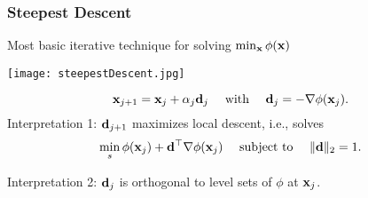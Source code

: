 
\begin{frame}
	\frametitle{Steepest Descent}
	Most basic iterative technique for solving $\min_{\bf x} \phi({\bf x})$
	\begin{center}
		\texttt{[image: steepestDescent.jpg]}
	\end{center}
	\begin{equation*}
		{\bf x}_{j+1} = {\bf x}_j + \alpha_j {\bf d}_j \quad \text{ with } \quad {\bf d}_j =  - \nabla \phi({\bf x}_j).
	\end{equation*}
	\pause
	Interpretation 1: ${\bf d}_{j+1}$ maximizes local descent, i.e., solves
	\begin{equation*}
		\min_{s} \phi({\bf x}_j) + {\bf d}^\top \nabla \phi({\bf x}_j) \quad \text{ subject to }\quad \|{\bf d}\|_2 = 1.
	\end{equation*}
	
	\pause
	
	Interpretation 2: ${\bf d}_j$ is orthogonal to level sets of $\phi$ at ${\bf x}_j$.
	
	
\end{frame}